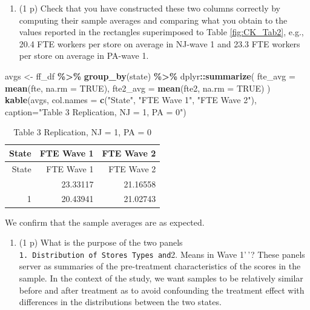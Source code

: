 \documentclass[
]{article}
\newenvironment{Shaded}{\begin{snugshade}}{\end{snugshade}}
\newcommand{\AttributeTok}[1]{\textcolor[rgb]{0.13,0.29,0.53}{#1}}
\newcommand{\ConstantTok}[1]{\textcolor[rgb]{0.56,0.35,0.01}{#1}}
\newcommand{\FunctionTok}[1]{\textcolor[rgb]{0.13,0.29,0.53}{\textbf{#1}}}
\newcommand{\NormalTok}[1]{#1}
\newcommand{\OtherTok}[1]{\textcolor[rgb]{0.56,0.35,0.01}{#1}}
\newcommand{\SpecialCharTok}[1]{\textcolor[rgb]{0.81,0.36,0.00}{\textbf{#1}}}
\newcommand{\StringTok}[1]{\textcolor[rgb]{0.31,0.60,0.02}{#1}}
\providecommand{\tightlist}{%
  \setlength{\itemsep}{0pt}\setlength{\parskip}{0pt}}
\begin{document}
\begin{enumerate}
  \begin{enumerate}
  \def\labelenumii{\alph{enumii}.}
  \setcounter{enumii}{1}
  \tightlist
  \item
    (1 p) Check that you have constructed these two columns correctly by
    computing their sample averages and comparing what you obtain to the
    values reported in the rectangles superimposed to Table
    \ref{fig:CK_Tab2}, e.g., 20.4 FTE workers per store on average in
    NJ-wave 1 and 23.3 FTE workers per store on average in PA-wave 1.
  \end{enumerate}

\begin{Shaded}
\begin{Highlighting}[]
\NormalTok{avgs }\OtherTok{\textless{}{-}}\NormalTok{ ff\_df }\SpecialCharTok{\%\textgreater{}\%} \FunctionTok{group\_by}\NormalTok{(state) }\SpecialCharTok{\%\textgreater{}\%}
\NormalTok{  dplyr}\SpecialCharTok{::}\FunctionTok{summarize}\NormalTok{(}
    \AttributeTok{fte\_avg =} \FunctionTok{mean}\NormalTok{(fte, }\AttributeTok{na.rm =} \ConstantTok{TRUE}\NormalTok{),}
    \AttributeTok{fte2\_avg =} \FunctionTok{mean}\NormalTok{(fte2, }\AttributeTok{na.rm =} \ConstantTok{TRUE}\NormalTok{)}
\NormalTok{  )}
\FunctionTok{kable}\NormalTok{(avgs, }\AttributeTok{col.names =} \FunctionTok{c}\NormalTok{(}\StringTok{"State"}\NormalTok{, }\StringTok{"FTE Wave 1"}\NormalTok{, }\StringTok{"FTE Wave 2"}\NormalTok{), }\AttributeTok{caption=}\StringTok{"Table 3 Replication, NJ = 1, PA = 0"}\NormalTok{)}
\end{Highlighting}
\end{Shaded}

  \begin{longtable}[]{@{}rrr@{}}
  \caption{Table 3 Replication, NJ = 1, PA = 0}\tabularnewline
  \toprule\noalign{}
  State & FTE Wave 1 & FTE Wave 2 \\
  \midrule\noalign{}
  \endfirsthead
  \toprule\noalign{}
  State & FTE Wave 1 & FTE Wave 2 \\
  \midrule\noalign{}
  \endhead
  \bottomrule\noalign{}
  \endlastfoot
  0 & 23.33117 & 21.16558 \\
  1 & 20.43941 & 21.02743 \\
  \end{longtable}

  We confirm that the sample averages are as expected.

  \begin{enumerate}
  \def\labelenumii{\alph{enumii}.}
  \setcounter{enumii}{2}
  \tightlist
  \item
    (1 p) What is the purpose of the two panels
    \texttt{1.\ Distribution\ of\ Stores\ Types\textquotesingle{}\textquotesingle{}\ and}2.
    Means in Wave 1'\,'? These panels server as summaries of the
    pre-treatment characteristics of the scores in the sample. In the
    context of the study, we want samples to be relatively similar
    before and after treatment as to avoid confounding the treatment
    effect with differences in the distributions between the two states.
  \end{enumerate}


\end{enumerate}
\end{document}

